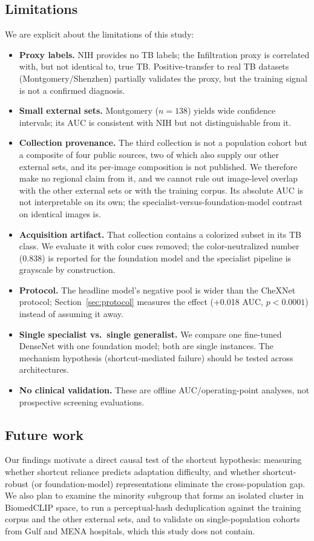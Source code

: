\documentclass[runningheads]{llncs}
\begin{document}
\subsection{Limitations}
We are explicit about the limitations of this study:
\begin{itemize}
\item \textbf{Proxy labels.} NIH provides no TB labels; the Infiltration proxy is correlated with, but not identical to, true TB. Positive-transfer to real TB datasets (Montgomery/Shenzhen) partially validates the proxy, but the training signal is not a confirmed diagnosis.
\item \textbf{Small external sets.} Montgomery ($n=138$) yields wide confidence intervals; its AUC is consistent with NIH but not distinguishable from it.
\item \textbf{Collection provenance.} The third collection is not a population cohort but a composite of four public sources, two of which also supply our other external sets, and its per-image composition is not published. We therefore make no regional claim from it, and we cannot rule out image-level overlap with the other external sets or with the training corpus. Its absolute AUC is not interpretable on its own; the specialist-versus-foundation-model contrast on identical images is.
\item \textbf{Acquisition artifact.} That collection contains a colorized subset in its TB class. We evaluate it with color cues removed; the color-neutralized number (0.838) is reported for the foundation model and the specialist pipeline is grayscale by construction.
\item \textbf{Protocol.} The headline model's negative pool is wider than the CheXNet protocol; Section~\ref{sec:protocol} measures the effect (+0.018 AUC, $p<0.0001$) instead of assuming it away.
\item \textbf{Single specialist vs.\ single generalist.} We compare one fine-tuned DenseNet with one foundation model; both are single instances. The mechanism hypothesis (shortcut-mediated failure) should be tested across architectures.
\item \textbf{No clinical validation.} These are offline AUC/operating-point analyses, not prospective screening evaluations.
\end{itemize}

\subsection{Future work}
Our findings motivate a direct causal test of the shortcut hypothesis: measuring whether shortcut reliance predicts adaptation difficulty, and whether shortcut-robust (or foundation-model) representations eliminate the cross-population gap. We also plan to examine the minority subgroup that forms an isolated cluster in BiomedCLIP space, to run a perceptual-hash deduplication against the training corpus and the other external sets, and to validate on single-population cohorts from Gulf and MENA hospitals, which this study does not contain.
\end{document}
